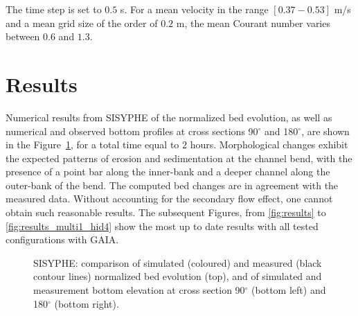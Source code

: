 The time step is set to $0.5$ s. For a mean velocity in the range $[0.37-0.53]$ m/s and
a mean grid size of the order of $0.2$ m, the mean Courant number varies between $0.6$ and $1.3$.

\section{Results}
%
Numerical results from SISYPHE of the normalized bed evolution, as well as numerical and observed bottom profiles at cross sections 90$^{\circ}$ and 180$^{\circ}$, are shown in the Figure~\ref{fig:results1}, for a total time equal to $2$ hours.
Morphological changes exhibit the expected
patterns of erosion and sedimentation at the channel bend, with the presence of a point bar along the inner-bank and a deeper channel along the outer-bank of the bend.
The computed bed changes are in agreement with the measured data. Without accounting for the secondary flow effect, one cannot obtain such reasonable results.
The subsequent Figures, from \ref{fig:results} to \ref{fig:results_multi1_hid4} show the most up to date results with all tested configurations with GAIA.

\begin{figure} [!h]
  \centering
  \caption{SISYPHE: comparison of simulated (coloured) and measured (black contour lines) normalized bed evolution (top),
    and of simulated and measurement bottom elevation at cross section 90$^{\circ}$ (bottom left) and 180$^{\circ}$ (bottom right).}\label{fig:results1}
\end{figure}


